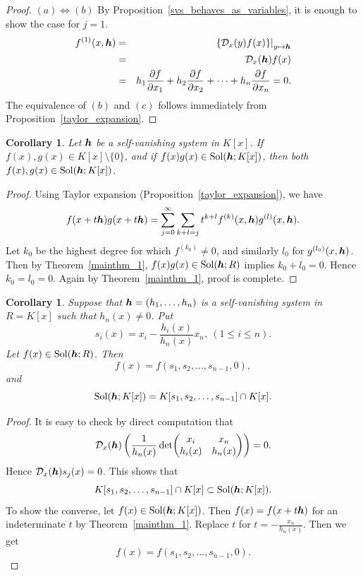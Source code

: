 \documentclass[12pt]{article}
\newtheorem{corollary}[theorem]{Corollary}
\theoremstyle{definition}
\theoremstyle{remark}
\def\cD{{\cal D}}
\def\sol{{\rm Sol}}
\def\boldh{\mbox{\boldmath $h$}}
\def\tinyh{\mbox{\scriptsize \boldmath $h$}}
\def\pa{\partial}
\begin{document}
\begin{proof}
$(a) \Leftrightarrow (b)$ By Proposition~\ref{svs_behaves_as_variables}, it is enough to show the case for $j=1$.  
\begin{eqnarray*}
 f^{(1)}(x, \boldh) & =  & \left.\left\{\cD_x(y)f(x)\right\}\right|_{y \mapsto \tinyh} \\
                   & = &  \cD_x(\boldh)f(x)  \\ 
                   & = &  h_1\frac{\pa f}{\pa x_1}+ h_2\frac{\pa f}{\pa x_2}+ \cdots + h_n\frac{\pa f}{\pa x_n} =0. 
\end{eqnarray*}
The equivalence of $(b)$ and $(c)$ follows immediately from  Proposition~\ref{taylor_expansion}. 
\end{proof}

\begin{corollary}  \label{any_factor_is_in_sol}  %
Let $\boldh$ be a self-vanishing system in $K[x]$.  If $f(x), g(x) \in K[x]\setminus \{0\}$, 
and if $f(x)g(x) \in \sol(\boldh; K[x])$, then both  $f(x), g(x) \in \sol(\boldh; K[x])$. 
\end{corollary}

\begin{proof}
Using Taylor expansion (Proposition~\ref{taylor_expansion}), we have 
\[f(x+t\boldh)g(x+t\boldh) = \sum _{j=0}^{\infty} \sum _{k+l=j} t^{k+l}f^{(k)}(x, \boldh) g^{(l)}(x, \boldh). \]
Let  $k_0$ be the highest degree for which $f^{(k_0)} \neq 0$, and similarly $l_0$ for 
$g^{(l_0)}(x, \boldh)$.  Then by Theorem~\ref{mainthm_1},  $f(x)g(x) \in \sol(\boldh; R)$ implies $k_0+l_0=0$.
Hence $k_0=l_0=0$.  Again by Theorem~\ref{mainthm_1}, proof is complete.
\end{proof}

\begin{corollary}  \label{solution_with_hn_inverted}  %
Suppose that $\boldh=(h_1, \ldots, h_n)$ is a self-vanishing system in $R=K[x]$ such that $h_n(x) \neq 0$. 
Put \[s_i(x)=x_i - \frac{h_i(x)}{h_n(x)}x_n, \ (1 \leq i \leq n).\]
Let $f(x) \in \sol(\boldh; R)$.  Then 
\[f(x)= f(s_1, s_2, \ldots, s_{n-1}, 0),\]
and 
\[\sol(\boldh; K[x])= K[s_1, s_2, \ldots, s_{n-1}] \cap K[x].\]
\end{corollary}

\begin{proof}
It is easy to check by direct computation that 
\[\cD_x(\boldh)\left(\frac{1}{h_n(x)}\, \text{det}\!\begin{pmatrix}     x_i&x_n   \\    h_i(x)&h_n(x) \end{pmatrix}  \right)=0.\]
Hence $\cD_x(\boldh)s_j(x)=0$.  This shows that 
\[K[s_1, s_2, \ldots, s_{n-1}] \cap K[x] \subset \sol(\boldh; K[x]).\]
To show the converse, let $f(x) \in \sol(\boldh; K[x])$.  
Then $f(x) = f(x+ t \boldh)$ for an indeterminate $t$ by Theorem~\ref{mainthm_1}. 
Replace  $t$  for  $t= -\frac{x_n}{h_n(x)}$.  Then we get 
\[f(x)=f(s_1, s_2, \ldots, s_{n-1}, 0).\] 
\end{proof}
\end{document}
